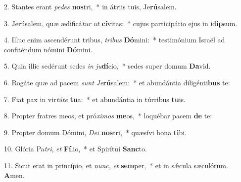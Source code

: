2. Stantes erant \textit{pe}\textit{des} \textbf{nos}tri,~*  in átriis tuis, Je\textbf{rú}salem.\

3. Jerúsalem, quæ ædificá\textit{tur} \textit{ut} \textbf{cí}vitas:~*  cujus participátio ejus in id\textbf{íp}sum.\

4. Illuc enim ascendérunt tribus, \textit{tri}\textit{bus} \textbf{Dó}mini:~*  testimónium Israël ad confiténdum nómini \textbf{Dó}mini.\

5. Quia illic sedérunt sedes \textit{in} \textit{ju}\textbf{dí}cio,~*  sedes super domum \textbf{Da}vid.\

6. Rogáte quæ ad pacem \textit{sunt} \textit{Je}\textbf{rú}salem:~*  et abundántia diligénti\textbf{bus} te:\

7. Fiat pax in vir\textit{tú}\textit{te} \textbf{tu}a:~*  et abundántia in túrribus \textbf{tu}is.\

8. Propter fratres meos, et pró\textit{xi}\textit{mos} \textbf{me}os,~*  loquébar pacem \textbf{de} te:\

9. Propter domum Dómini, \textit{De}\textit{i} \textbf{nos}tri,~*  quæsívi bona \textbf{ti}bi.\

10. Glória Pa\textit{tri}, \textit{et} \textbf{Fí}lio,~*  et Spirítui \textbf{Sanc}to.\

11. Sicut erat in princípio, et \textit{nunc}, \textit{et} \textbf{sem}per,~*  et in sǽcula sæculórum. \textbf{A}men.\

